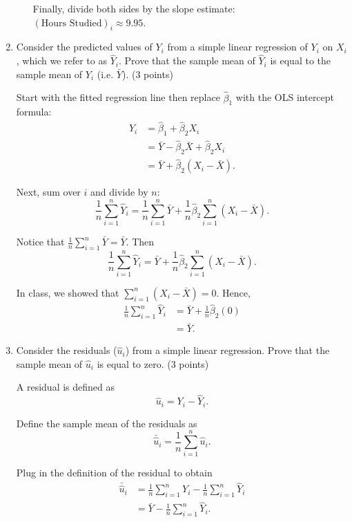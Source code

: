 \documentclass[11pt]{article}
\begin{document}
\begin{onehalfspacing}
\begin{enumerate}
\begin{enumerate}
{		Finally, divide both sides by the slope estimate: $(\text{Hours Studied})_i \approx 9.95$.
	}\\

\end{enumerate}

\item Consider the predicted values of $Y_i$ from a simple linear regression of $Y_i$ on $X_i$, which we refer to as $\hat{Y}_i$. Prove that the sample mean of $\hat{Y}_i$ is equal to the sample mean of $Y_i$ (i.e. $\bar{Y}$). (3 points)\\


{\color{pine_green}
	
	Start with the fitted regression line then replace $\hat{\beta}_1$ with the OLS intercept formula:
	\begin{align*}
	\hat{Y}_i &= \hat{\beta}_1 + \hat{\beta}_2X_i \\
	 &= \bar{Y} - \hat{\beta}_2\bar{X} + \hat{\beta}_2X_i \\
	&= \bar{Y} + \hat{\beta}_2(X_i -\bar{X}).
	\end{align*}
	
	Next, sum over $i$ and divide by $n$:
	$$ \frac{1}{n} \sum_{i=1}^n \hat{Y}_i = \frac{1}{n} \sum_{i=1}^n \bar{Y} + \frac{1}{n} \hat{\beta}_2 \sum_{i=1}^n (X_i -\bar{X}). $$

	Notice that $\frac{1}{n} \sum_{i=1}^n \bar{Y} = \bar{Y}$. Then 
	$$ \frac{1}{n} \sum_{i=1}^n \hat{Y}_i = \bar{Y} + \frac{1}{n} \hat{\beta}_2 \sum_{i=1}^n (X_i -\bar{X}). $$

	In class, we showed that $\sum_{i=1}^n (X_i -\bar{X})=0$. Hence, 
	\begin{align*}
	\frac{1}{n} \sum_{i=1}^n \hat{Y}_i &= \bar{Y} + \frac{1}{n} \hat{\beta}_2 (0) \\
	&= \bar{Y}.
	\end{align*}
		}

\item Consider the residuals ($\hat{u}_i$) from a simple linear regression. Prove that the sample mean of $\hat{u}_i$ is equal to zero. (3 points)\\


{\color{pine_green}
	
	A residual is defined as
	$$ \hat{u}_i = Y_i - \hat{Y}_i. $$
	
	Define the sample mean of the residuals as
	$$ \bar{\hat{u}}_i = \frac{1}{n} \sum_{i=1}^n \hat{u}_i. $$
	
	Plug in the definition of the residual to obtain
	\begin{align*}
	\bar{\hat{u}}_i &=\frac{1}{n} \sum_{i=1}^n Y_i - \frac{1}{n} \sum_{i=1}^n \hat{Y}_i \\
	&= \bar{Y} - \frac{1}{n} \sum_{i=1}^n \hat{Y}_i.
	\end{align*}
	
}
\end{enumerate}
\end{onehalfspacing}
\end{document}
